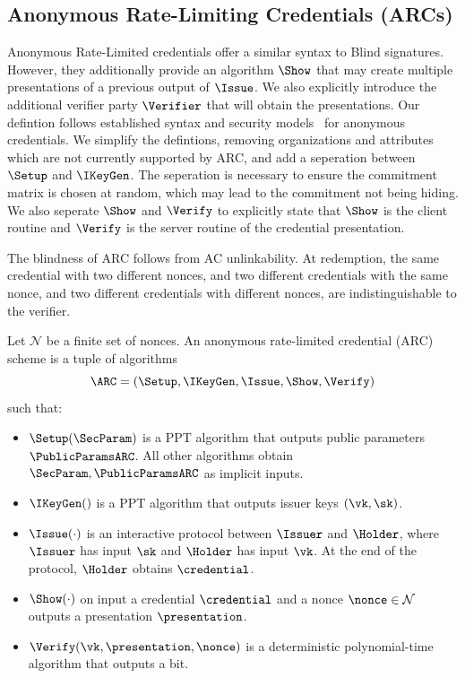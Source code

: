 \subsection{Anonymous Rate-Limiting Credentials (ARCs)}
\label{subsec:arc-security}
Anonymous Rate-Limited credentials offer a similar syntax to Blind signatures. 
However, they additionally provide an algorithm $\Show$ that may create multiple presentations of a previous output of $\Issue$.
We also explicitly introduce the additional verifier party $\Verifier$ that will obtain the presentations. Our defintion follows established syntax and security models~\cite{JOC:FucHanSla19,C:BLNS23} for anonymous credentials. 
We simplify the defintions, removing organizations and attributes which are not currently supported by ARC, and add a seperation between $\Setup$ and $\IKeyGen$.
The seperation is necessary to ensure the commitment matrix is chosen at random, which may lead to the commitment not being hiding. 
We also seperate $\Show$ and $\Verify$ to explicitly state that $\Show$ is the
client routine and $\Verify$ is the server routine of the credential
presentation. 

The blindness of ARC follows from AC unlinkability. 
At redemption, the same credential with two different nonces, and two different credentials with the same nonce, and two different credentials with different nonces, are indistinguishable to the verifier. 
\begin{definition}\label{def:arc-syntax}
Let $\mathcal{N}$ be a finite set of nonces. 
An anonymous rate-limited credential (ARC) scheme is a tuple of algorithms
\[
  \ARC=(\Setup,\IKeyGen,\Issue,\Show,\Verify)
\]
such that: %
\begin{itemize}[leftmargin=1.25em]
   \item $\Setup(\SecParam)$ is a PPT algorithm that outputs public parameters $\PublicParamsARC$. All other algorithms obtain $\SecParam,\PublicParamsARC$ as implicit inputs.

    \item $\IKeyGen()$ is a PPT algorithm that outputs issuer keys $(\vk,\sk)$.
    \item $\Issue(\cdot)$ is an interactive protocol between $\Issuer$ and $\Holder$, where $\Issuer$ has input $\sk$ and $\Holder$ has input $\vk$. At the end of the protocol, $\Holder$ obtains $\credential$.
  \item $\Show(\cdot)$ on input a credential $\credential$ and a nonce $\nonce\in \mathcal{N}$ outputs a presentation $\presentation$. 
  
  \item $\Verify(\vk,\presentation,\nonce)$ is a deterministic polynomial-time algorithm that outputs a bit.
 \end{itemize}
\end{definition}

